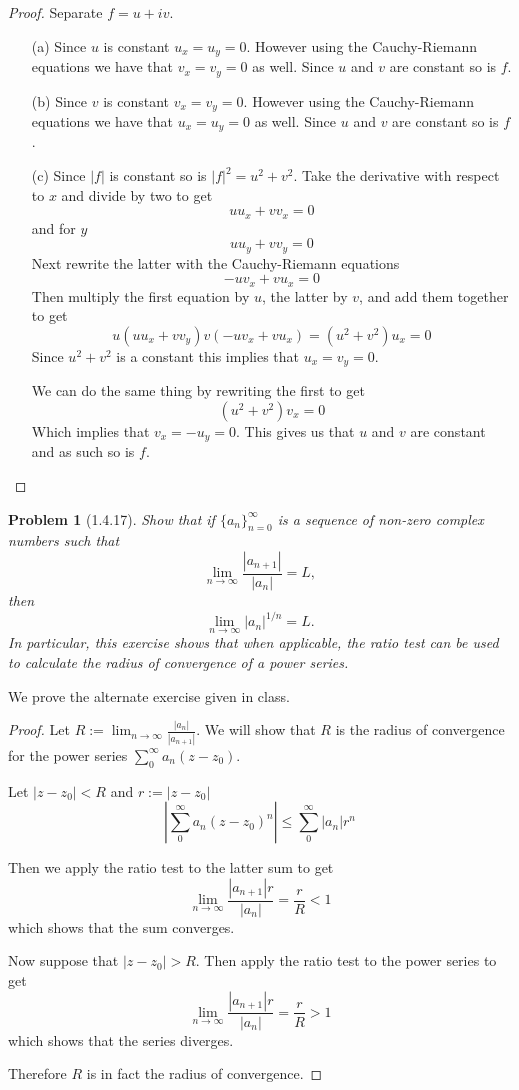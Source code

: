 \documentclass[10pt]{article}
\newcommand{\sk}{\vskip 10mm}
\theoremstyle{plain}
\newtheorem{problem}{Problem}
\theoremstyle{remark}
\begin{document}
\begin{proof}
  Separate $f=u+iv$.
  \begin{itemize}
  \item[(a)] Since $u$ is constant $u_x=u_y=0$. However using the
    Cauchy-Riemann equations we have that $v_x=v_y=0$ as well. Since
    $u$ and $v$ are constant so is $f$.
  \item[(b)] Since $v$ is constant $v_x=v_y=0$. However using the
    Cauchy-Riemann equations we have that $u_x=u_y=0$ as well. Since
    $u$ and $v$ are constant so is $f$.
  \item[(c)] Since $|f|$ is constant so is $|f|^2=u^2+v^2$. Take the
    derivative with respect to $x$ and divide by two to get
    \[
      uu_x+vv_x=0
    \]
    and for $y$
    \[
      uu_y+vv_y=0
    \]
    Next rewrite the latter with the Cauchy-Riemann equations
    \[
      -uv_x+vu_x=0
    \]
    Then multiply the first equation by $u$, the latter by $v$,
    and add them together to get
    \[
      u(uu_x+vv_y)v(-uv_x+vu_x)=(u^2+v^2)u_x=0
    \]
    Since $u^2+v^2$ is a constant this implies that $u_x=v_y=0$.

    We can do the same thing by rewriting the first to get
    \[
      (u^2+v^2)v_x=0
    \]
    Which implies that $v_x=-u_y=0$. This gives us that
    $u$ and $v$ are constant and as such so is $f$.
  \end{itemize}
\end{proof}

\sk

\begin{problem}[1.4.17]
  Show that if $\{a_n\}_{n=0}^\infty$ is a sequence of non-zero complex numbers
  such that
  \[
    \lim_{n\rightarrow\infty}\frac{|a_{n+1}|}{|a_n|}=L,
  \]
  then
  \[
    \lim_{n\rightarrow\infty}|a_n|^{1/n}=L.
  \]
  In particular, this exercise shows that when applicable, the ratio test
  can be used to calculate the radius of convergence of a power series.
\end{problem}

We prove the alternate exercise given in class.

\begin{proof}
  Let $R:=\lim_{n\rightarrow\infty}\frac{|a_n|}{|a_{n+1}|}$. We will show
  that $R$ is the radius of convergence for the power series
  $\sum_0^\infty a_n(z-z_0)$.

  Let $|z-z_0|<R$ and $r:=|z-z_0|$
  \[
    \left|
      \sum_0^\infty a_n(z-z_0)^n
    \right|
    \leq \sum_0^\infty |a_n|r^n
  \]

  Then we apply the ratio test to the latter sum to get
  \[
    \lim_{n\rightarrow\infty}\frac{|a_{n+1}|r}{|a_n|}=\frac{r}{R}<1
  \]
  which shows that the sum converges.

  Now suppose that $|z-z_0|>R$. Then apply the ratio test to
  the power series to get
  \[
    \lim_{n\rightarrow\infty}\frac{|a_{n+1}|r}{|a_n|} = \frac{r}{R}>1
  \]
  which shows that the series diverges.

  Therefore $R$ is in fact the radius of convergence.
\end{proof}
\end{document}

